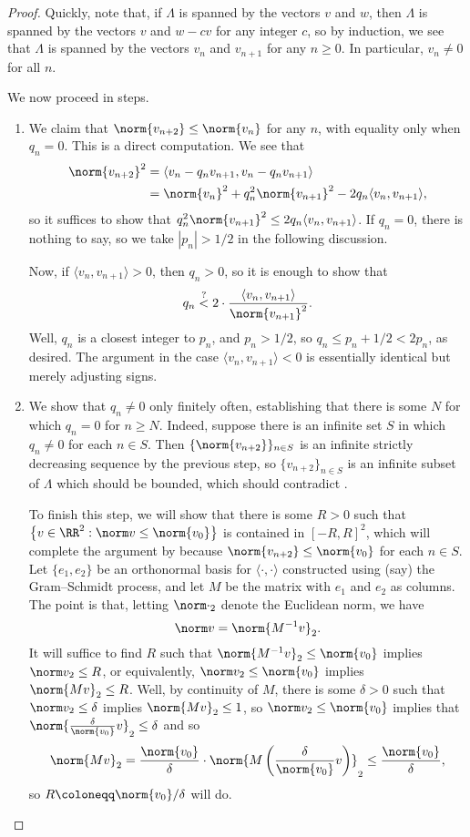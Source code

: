 \documentclass[../notes.tex]{subfiles}
\begin{document}
\begin{proof}
	Quickly, note that, if $\Lambda$ is spanned by the vectors $v$ and $w$, then $\Lambda$ is spanned by the vectors $v$ and $w-cv$ for any integer $c$, so by induction, we see that $\Lambda$ is spanned by the vectors $v_n$ and $v_{n+1}$ for any $n\ge0$. In particular, $v_n\ne0$ for all $n$.

	We now proceed in steps.
	\begin{enumerate}
		\item We claim that $\norm{v_{n+2}}\le\norm{v_n}$ for any $n$, with equality only when $q_n=0$. This is a direct computation. We see that
		\begin{align*}
			\norm{v_{n+2}}^2 &= \langle v_n-q_nv_{n+1},v_n-q_nv_{n+1}\rangle \\
			&= \norm{v_n}^2+q_n^2\norm{v_{n+1}}^2-2q_n\langle v_n,v_{n+1}\rangle,
		\end{align*}
		so it suffices to show that $q_n^2\norm{v_{n+1}}^2\le2q_n\langle v_n,v_{n+1}\rangle$. If $q_n=0$, there is nothing to say, so we take $\left|p_n\right|>1/2$ in the following discussion.
		
		Now, if $\langle v_n,v_{n+1}\rangle>0$, then $q_n>0$, so it is enough to show that
		\[q_n\stackrel?<2\cdot\frac{\langle v_n,v_{n+1}\rangle}{\norm{v_{n+1}}^2}.\]
		Well, $q_n$ is a closest integer to $p_n$, and $p_n>1/2$, so $q_n\le p_n+1/2<2p_n$, as desired. The argument in the case $\langle v_n,v_{n+1}\rangle<0$ is essentially identical but merely adjusting signs.

		\item We show that $q_n\ne0$ only finitely often, establishing that there is some $N$ for which $q_n=0$ for $n\ge N$. Indeed, suppose there is an infinite set $S$ in which $q_n\ne0$ for each $n\in S$. Then $\{\norm{v_{n+2}}\}_{n\in S}$ is an infinite strictly decreasing sequence by the previous step, so $\{v_{n+2}\}_{n\in S}$ is an infinite subset of $\Lambda$ which should be bounded, which should contradict .

		To finish this step, we will show that there is some $R>0$ such that $\left\{v\in\RR^2:\norm v\le\norm{v_0}\right\}$ is contained in $[-R,R]^2$, which will complete the argument by  because $\norm{v_{n+2}}\le\norm{v_0}$ for each $n\in S$. Let $\{e_1,e_2\}$ be an orthonormal basis for $\langle\cdot,\cdot\rangle$ constructed using (say) the Gram--Schmidt process, and let $M$ be the matrix with $e_1$ and $e_2$ as columns. The point is that, letting $\norm\cdot_2$ denote the Euclidean norm, we have
		\[\norm v=\norm{M^{-1}v}_2.\]
		It will suffice to find $R$ such that $\norm{M^{-1}v}_2\le\norm{v_0}$ implies $\norm v_2\le R$, or equivalently, $\norm v_2\le\norm{v_0}$ implies $\norm{Mv}_2\le R$. Well, by continuity of $M$, there is some $\delta>0$ such that $\norm v_2\le\delta$ implies $\norm{Mv}_2\le1$, so $\norm v_2\le\norm{v_0}$ implies that $\norm{\frac{\delta}{\norm{v_0}}v}_2\le\delta$ and so
		\[\norm{Mv}_2=\frac{\norm{v_0}}{\delta}\cdot\norm{M\left(\frac{\delta}{\norm{v_0}}v\right)}_2\le\frac{\norm{v_0}}{\delta},\]
		so $R\coloneqq\norm{v_0}/\delta$ will do.


\end{enumerate}
\end{proof}
\end{document}
